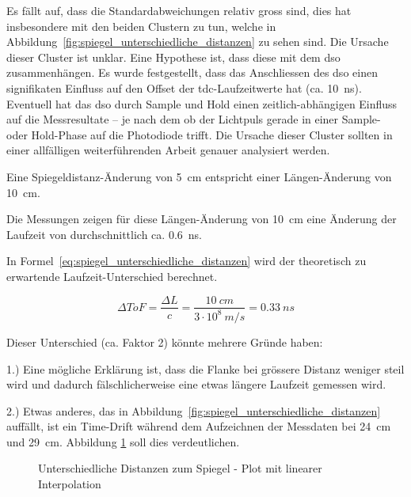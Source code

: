 Es fällt auf, dass die Standardabweichungen relativ gross sind, dies hat insbesondere mit den beiden Clustern zu tun,
welche in Abbildung~\ref{fig:spiegel_unterschiedliche_distanzen} zu sehen sind. Die Ursache dieser Cluster ist unklar.
Eine Hypothese ist, dass diese mit dem \acrshort{dso} zusammenhängen. Es wurde festgestellt, dass das Anschliessen des
\acrshort{dso} einen signifikaten Einfluss auf den Offset der \acrshort{tdc}-Laufzeitwerte hat (ca. 10~ns). Eventuell
hat das \acrshort{dso} durch Sample und Hold einen zeitlich-abhängigen Einfluss auf die Messresultate -- je nach dem ob
der Lichtpuls gerade in einer Sample- oder Hold-Phase auf die Photodiode trifft. Die Ursache dieser Cluster sollten in
einer allfälligen weiterführenden Arbeit genauer analysiert werden.

Eine Spiegeldistanz-Änderung von 5~cm entspricht einer Längen-Änderung von 10~cm.

Die Messungen zeigen für diese Längen-Änderung von 10~cm eine Änderung der Laufzeit von durchschnittlich ca. 0.6~ns.

In Formel~\ref{eq:spiegel_unterschiedliche_distanzen} wird der theoretisch zu erwartende Laufzeit-Unterschied berechnet.

\begin{equation}\label{eq:spiegel_unterschiedliche_distanzen}
    \Delta ToF = \frac{\Delta L}{c} = \frac{10~cm}{3 \cdot 10^8~m/s} = 0.33~ns
\end{equation}

Dieser Unterschied (ca. Faktor 2) könnte mehrere Gründe haben:

1.) Eine mögliche Erklärung ist, dass die Flanke bei grössere Distanz weniger steil wird und dadurch fälschlicherweise
eine etwas längere Laufzeit gemessen wird.

2.) Etwas anderes, das in Abbildung~\ref{fig:spiegel_unterschiedliche_distanzen} auffällt, ist ein Time-Drift während
dem Aufzeichnen der Messdaten bei 24~cm und 29~cm. Abbildung \ref{fig:spiegel_unterschiedliche_distanzen_linear} soll
dies verdeutlichen.

\begin{figure}[H]
    \centering
    
    \caption{Unterschiedliche Distanzen zum Spiegel - Plot mit linearer Interpolation}\label{fig:spiegel_unterschiedliche_distanzen_linear}
\end{figure}

